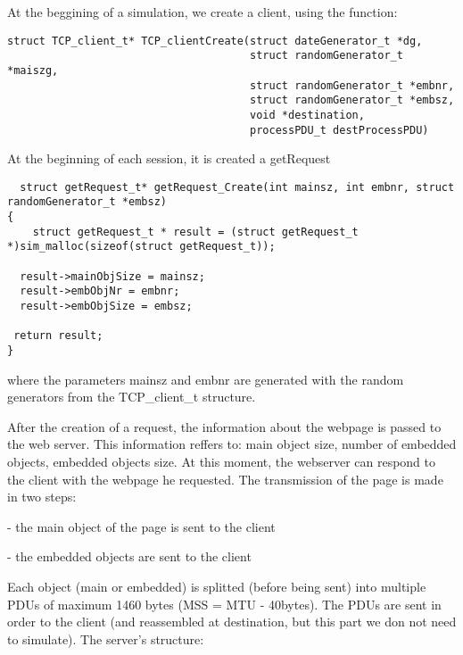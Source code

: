  At the beggining of a simulation, we create a client, using the function:
\begin{verbatim}
struct TCP_client_t* TCP_clientCreate(struct dateGenerator_t *dg,
                                      struct randomGenerator_t *maiszg,
                                      struct randomGenerator_t *embnr,
                                      struct randomGenerator_t *embsz,
                                      void *destination,
                                      processPDU_t destProcessPDU)
\end{verbatim}
At the beginning of each session, it is created a getRequest
\begin{verbatim}
  struct getRequest_t* getRequest_Create(int mainsz, int embnr, struct randomGenerator_t *embsz)
{
    struct getRequest_t * result = (struct getRequest_t *)sim_malloc(sizeof(struct getRequest_t));

  result->mainObjSize = mainsz;
  result->embObjNr = embnr;
  result->embObjSize = embsz;

 return result;
}
\end{verbatim}
where the parameters mainsz and embnr are generated with the random generators from the TCP\_client\_t structure.

After the creation of a request, the information about the webpage is passed to the web server. This information reffers to: main object size, number of embedded
objects, embedded objects size.
At this moment, the webserver can respond to the client with the webpage he requested.
The transmission of the page is made in two steps:
\begin{description}
 \item - the main object of the page is sent to the client
 \item - the embedded objects are sent to the client 
\end{description} 
 
Each object (main or embedded) is splitted (before being sent) into multiple PDUs of maximum 1460 bytes (MSS = MTU - 40bytes).
The PDUs are sent in order to the client (and reassembled at destination, but this part we don not need to simulate).
The server's structure:

